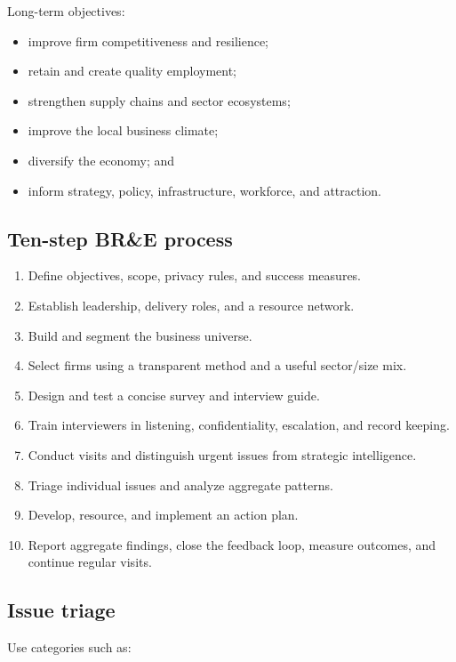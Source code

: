 \documentclass[11pt,letterpaper,oneside,openany]{book}
\begin{document}
Long-term objectives:


\begin{itemize}
\item improve firm competitiveness and resilience;
\item retain and create quality employment;
\item strengthen supply chains and sector ecosystems;
\item improve the local business climate;
\item diversify the economy; and
\item inform strategy, policy, infrastructure, workforce, and attraction.
\end{itemize}


\subsection[Ten-step BR\&E process]{Ten-step BR\&E process}
\begin{enumerate}
\item Define objectives, scope, privacy rules, and success measures.
\item Establish leadership, delivery roles, and a resource network.
\item Build and segment the business universe.
\item Select firms using a transparent method and a useful sector/size mix.
\item Design and test a concise survey and interview guide.
\item Train interviewers in listening, confidentiality, escalation, and record keeping.
\item Conduct visits and distinguish urgent issues from strategic intelligence.
\item Triage individual issues and analyze aggregate patterns.
\item Develop, resource, and implement an action plan.
\item Report aggregate findings, close the feedback loop, measure outcomes, and continue regular visits.
\end{enumerate}


\subsection[Issue triage]{Issue triage}
Use categories such as:
\end{document}
